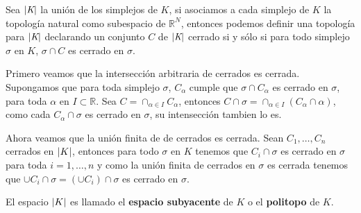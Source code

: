 \begin{Teo}
Sea $\left| \textit{K} \right|$ la unión de los simplejos de $\textit{K}$, si asociamos a cada simplejo de $\textit{K}$ la topología natural como subespacio de $\mathbb{R}^N$, entonces podemos definir una topología para $\left| \textit{K} \right|$ declarando  un conjunto $C$ de  $\left| \textit{K} \right|$ cerrado si y sólo si para todo simplejo $\sigma$ en  $\textit{K}$, $\sigma\cap C$ es cerrado en $\sigma$.
\end{Teo}
\begin{Dem}

Primero veamos que la intersección  arbitraria de cerrados es cerrada. Supongamos que para toda simplejo $\sigma$, $C_{\alpha}$ cumple que $\sigma\cap C_{\alpha}$ es cerrado en $\sigma$, para toda $\alpha$ en $I\subset \mathbb{R}$.
Sea $C = \cap_{\alpha \in I}C_{\alpha}$, entonces $C\cap\sigma = \cap_{\alpha\in I}(C_{\alpha}\cap\alpha)$, como cada $C_{\alpha}\cap \sigma$ es cerrado en $\sigma$, su intensección tambien lo es.

Ahora veamos que la unión finita de de cerrados es cerrada. Sean $C_1,\ldots,C_n$ cerrados en $\left| K \right|$, entonces para todo $\sigma$ en $K$ tenemos que $C_i \cap \sigma$ es cerrado en $\sigma$ para toda $i =1,\ldots,n$ y como la unión finita de cerrados en $\sigma$ es cerrada tenemos que $\cup C_i\cap\sigma = (\cup C_i)\cap\sigma$ es cerrado en $\sigma$.
\end{Dem}
El espacio $\left| K \right|$ es llamado el \textbf{espacio subyacente} de $K$ o el \textbf{politopo} de $K$.

